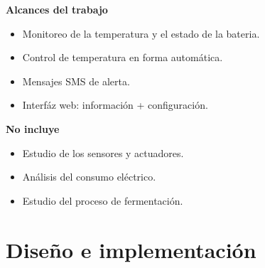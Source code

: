 \documentclass[11pt]{beamer}
\begin{document}
\begin{frame}{\textbf{\LARGE{Alcances del trabajo}}}
  \fontsize{18pt}{18}\selectfont
  \begin{minipage}[c]{1.0\linewidth}
    \centering
      \begin{itemize}
        \item Monitoreo de la temperatura y el estado de la bateria.
          \vspace{10px}
        \item Control de temperatura en forma automática.
          \vspace{10px}      	
        \item Mensajes SMS de alerta.
          \vspace{10px}
        \item Interfáz web: información + configuración.
          \vspace{10px}
      \end{itemize}
  \end{minipage}
\end{frame}


\begin{frame}{\textbf{\LARGE{No incluye}}}
  \fontsize{18pt}{18}\selectfont
  \begin{minipage}[c]{1.0\linewidth}
    \centering
      \begin{itemize}
        \item Estudio de los sensores y actuadores.
          \vspace{10px}
        \item Análisis del consumo eléctrico.
          \vspace{10px}
        \item Estudio del proceso de fermentación.
          \vspace{10px}
      \end{itemize}
  \end{minipage}
\end{frame}


\section{Diseño e implementación}
\end{document}
